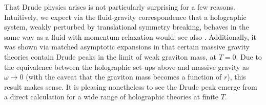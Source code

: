 \documentclass[10pt, oneside]{book}
\begin{document}
\begin{doublespace}
That Drude physics arises is not particularly surprising for a few reasons.   Intuitively, we expect via the fluid-gravity correspondence \cite{Bhattacharyya:2008jc} that a holographic system, weakly perturbed by translational symmetry breaking, behaves in the same way as a fluid with momentum relaxation would:  see also \cite{Balasubramanian:2013yqa}.    Additionally, it was shown via matched asymptotic expansions in \cite{Davison:2013jba} that certain massive gravity theories contain Drude peaks in the limit of weak graviton mass, at $T=0$.   Due to the equivalence between the holographic set-ups above and massive gravity as $\omega\rightarrow 0$ \cite{Blake:2013owa} (with the caveat that the graviton mass becomes a function of $r$), this result makes sense.   It is pleasing nonetheless to see the Drude peak emerge from a direct calculation for a wide range of holographic theories at finite $T$.



\end{doublespace}
\end{document}
